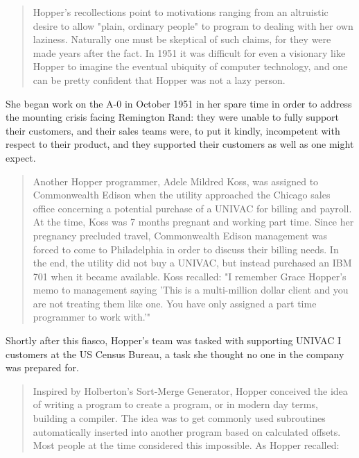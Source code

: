 \begin{quotation}
Hopper's recollections point to motivations
ranging from an altruistic desire to allow "plain, ordinary people"
to program to dealing with her own laziness. Naturally one must
be skeptical of such claims, for they were made years after the
fact. In 1951 it was difficult for even a visionary like Hopper to
imagine the eventual ubiquity of computer technology, and one
can be pretty confident that Hopper was not a lazy person.\cite{grace_hopper_and_the_invention_of_the_information_age_2009}
\end{quotation}

She began work on the A-0 in October 1951 in her spare time in order to address
the mounting crisis facing Remington Rand: they were unable to fully support their
customers, and their sales teams were, to put it kindly, incompetent with respect
to their product, and they supported their customers as well as one might expect.

\begin{quotation}
Another Hopper programmer, Adele Mildred Koss, was
assigned to Commonwealth Edison when the utility approached
the Chicago sales office concerning a potential purchase of a
UNIVAC for billing and payroll. At the time, Koss was 7 months
pregnant and working part time. Since her pregnancy precluded
travel, Commonwealth Edison management was forced to come
to Philadelphia in order to discuss their billing needs. In the end,
the utility did not buy a UNIVAC, but instead purchased an IBM
701 when it became available. Koss recalled: "I remember Grace
Hopper's memo to management saying 'This is a multi-million
dollar client and you are not treating them like one. You have
only assigned a part time programmer to work with.'"
\cite[Adele Mildred Koss, interviewed by Kathy Kleiman]{grace_hopper_and_the_invention_of_the_information_age_2009}
\end{quotation}

Shortly after this fiasco, Hopper's team was tasked with supporting UNIVAC I customers
at the US Census Bureau, a task she thought no one in the company was prepared for.

\begin{quotation}
Inspired by Holberton's Sort-Merge Generator, Hopper conceived the idea of writing a 
program to create a program, or in modern day terms, building a compiler. 
The idea was to get commonly used subroutines automatically inserted into another program based on calculated offsets. 
Most people at the time considered this impossible. As Hopper recalled:\cite{women_in_computing_history_2002}
\end{quotation}

